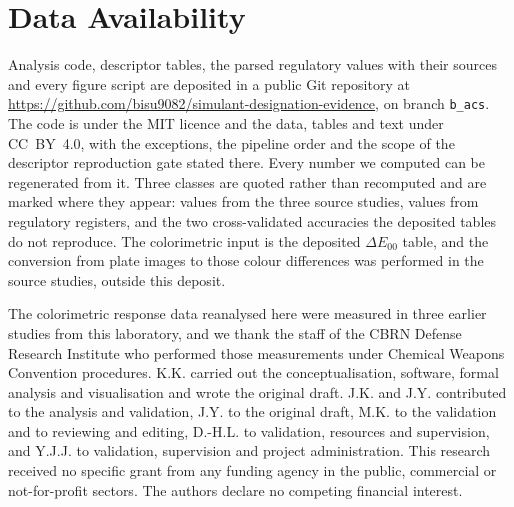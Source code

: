 \documentclass[journal=jacsat,manuscript=article,margin=1in]{achemso}
\begin{document}
\section*{Data Availability}
Analysis code, descriptor tables, the parsed regulatory values with their
sources and every figure script are deposited in a public Git repository at
\url{https://github.com/bisu9082/simulant-designation-evidence}, on branch
\texttt{b\_acs}.\cite{simulantrepo} The code is under the MIT
licence and the data, tables and text under CC~BY~4.0, with the exceptions,
the pipeline order and the scope of the descriptor reproduction gate stated
there. Every number we computed can be regenerated from it. Three classes
are quoted rather than recomputed and are marked where they appear: values
from the three source studies, values from regulatory registers, and the
two cross-validated accuracies the deposited tables do not reproduce. The
colorimetric input is the deposited $\Delta E_{00}$ table, and the conversion
from plate images to those colour differences was performed in the source
studies, outside this deposit.

\begin{acknowledgement}
The colorimetric response data reanalysed here were measured in three earlier
studies from this laboratory\cite{hazref,multiplexref,group3ref}, and we thank
the staff of the CBRN Defense Research Institute who performed those
measurements under Chemical Weapons Convention procedures. K.K. carried out
the conceptualisation, software, formal analysis and visualisation and wrote
the original draft. J.K. and J.Y. contributed to the analysis and validation,
J.Y. to the original draft, M.K. to the validation and to reviewing and
editing, D.-H.L. to validation, resources and supervision, and Y.J.J. to
validation, supervision and project administration. This research received no
specific grant from any funding agency in the public, commercial or
not-for-profit sectors. The authors declare no competing financial interest.
\end{acknowledgement}
\end{document}
